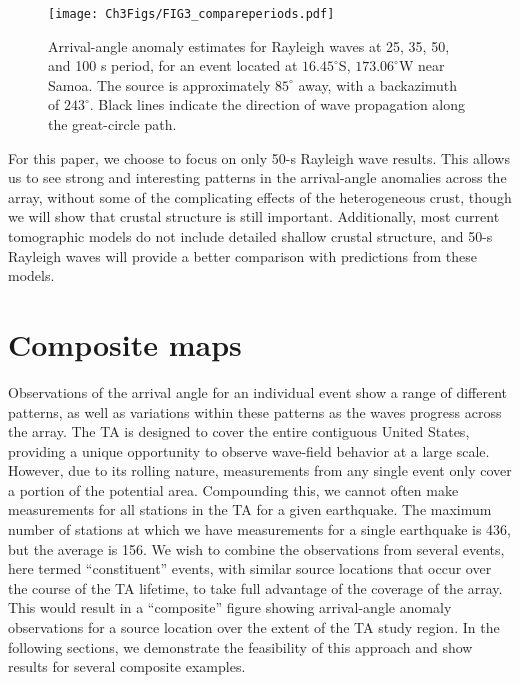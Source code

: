 \documentclass[12pt,oneside]{book}
\newcommand{\degree}[1]{\mbox{$#1^{\circ}$}}
\begin{document}
\begin{figure} 
\begin{center}
\texttt{[image: Ch3Figs/FIG3\_compareperiods.pdf]} 
\caption[Arrival-angle anomaly estimates at varying periods]{Arrival-angle anomaly estimates for Rayleigh waves at 25, 35, 50, and 100 s period, for an event located at \degree{16.45}S, \degree{173.06}W near Samoa. The source is approximately \degree{85} away, with a backazimuth of \degree{243}. Black lines indicate the direction of wave propagation along the great-circle path. }
\label{figaa:compareperiods}
\end{center}
\end{figure}
%

For this paper, we choose to focus on only 50-s Rayleigh wave results. This allows us to see strong and interesting patterns in the arrival-angle anomalies across the array, without some of the complicating effects of the heterogeneous crust, though we will show that crustal structure is still important. Additionally, most current tomographic models do not include detailed shallow crustal structure, and 50-s Rayleigh waves will provide a better comparison with predictions from these models. 

\section{Composite maps}
Observations of the arrival angle for an individual event show a range of different patterns, as well as variations within these patterns as the waves progress across the array. The TA is designed to cover the entire contiguous United States, providing a unique opportunity to observe wave-field behavior at a large scale. However, due to its rolling nature, measurements from any single event only cover a portion of the potential area. Compounding this, we cannot often make measurements for all stations in the TA for a given earthquake. The maximum number of stations at which we have measurements for a single earthquake is 436, but the average is 156. We wish to combine the observations from several events, here termed ``constituent'' events, with similar source locations that occur over the course of the TA lifetime, to take full advantage of the coverage of the array. This would result in a ``composite'' figure showing arrival-angle anomaly observations for a source location over the extent of the TA study region. In the following sections, we demonstrate the feasibility of this approach and show results for several composite examples.  
\end{document}
